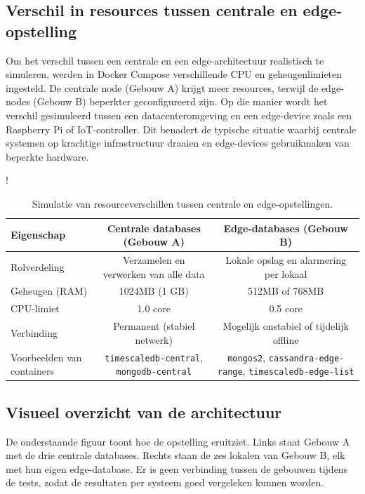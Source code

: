 \subsection{Verschil in resources tussen centrale en edge-opstelling}

Om het verschil tussen een centrale en een edge-architectuur realistisch te simuleren, werden in Docker Compose verschillende CPU en geheugenlimieten ingesteld.
 De centrale node (Gebouw A) krijgt meer resources, terwijl de edge-nodes (Gebouw B) beperkter geconfigureerd zijn.
Op die manier wordt het verschil gesimuleerd tussen een datacenteromgeving en een edge-device zoals een Raspberry Pi of IoT-controller.
 Dit benadert de typische situatie waarbij centrale systemen op krachtige infrastructuur draaien en edge-devices gebruikmaken van beperkte hardware.
\begin{table}[H]
\centering
\begin{resizebox}{\textwidth}{!}{
  \begin{tabular}{|l|c|c|}
  \hline
  \textbf{Eigenschap} & \textbf{Centrale databases (Gebouw A)} & \textbf{Edge-databases (Gebouw B)} \\
  \hline
  Rolverdeling & Verzamelen en verwerken van alle data & Lokale opslag en alarmering per lokaal \\
  Geheugen (RAM) & 1024MB (1 GB) & 512MB of 768MB \\
  CPU-limiet & 1.0 core & 0.5 core \\
  Verbinding & Permanent (stabiel netwerk) & Mogelijk onstabiel of tijdelijk offline \\
  Voorbeelden van containers & \texttt{timescaledb-central}, \texttt{mongodb-central} & \texttt{mongos2}, \texttt{cassandra-edge-range}, \texttt{timescaledb-edge-list} \\
  \hline
  \end{tabular}
}
\end{resizebox}
\caption{Simulatie van resourceverschillen tussen centrale en edge-opstellingen.}
\label{tab:resources}
\end{table}

\subsection{Visueel overzicht van de architectuur}

De onderstaande figuur toont hoe de opstelling eruitziet. Links staat Gebouw A met de drie centrale databases. Rechts staan de zes lokalen van Gebouw B, elk met hun eigen edge-database. Er is geen verbinding tussen de gebouwen tijdens de tests, zodat de resultaten per systeem goed vergeleken kunnen worden.

